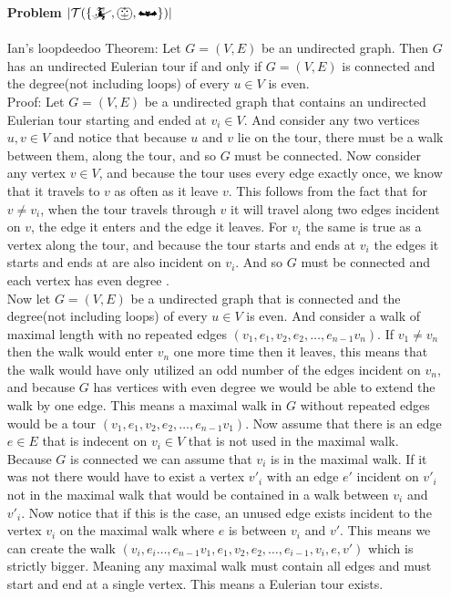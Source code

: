 \documentclass[12pt]{amsart}
\theoremstyle{definition}
\begin{document}
\begin{itemize}[align=left]
\item[\textbf{Problem $|\mathcal{T}(\{\mathwitch, \bigpumpkin, \mathbat\})|$}] %
    \;\\\\
    Ian's loopdeedoo Theorem: Let $G=(V,E)$ be an undirected graph. Then $G$ has an undirected Eulerian tour if and only if $G=(V,E)$ is connected and the degree(not including loops) of every $u\in V$ is even. \\

    Proof: Let $G=(V,E)$ be a undirected graph that contains an undirected Eulerian tour starting and ended at $v_i\in V$. And consider any two vertices $u,v\in V$ and notice that because $u$ and $v$ lie on the tour, there must be a walk between them, along the tour, and so $G$ must be connected. Now consider any vertex $v\in V$, and because the tour uses every edge exactly once, we know that it travels to $v$ as often as it leave $v$. This follows from the fact that for $v\neq v_i$, when the tour travels through $v$ it will travel along two edges incident on $v$, the edge it enters and the edge it leaves. For $v_i$ the same is true as a vertex along the tour, and because the tour starts and ends at $v_i$ the edges it starts and ends at are also incident on $v_i$. And so $G$ must be connected and each vertex has even degree .\\

    Now let $G=(V,E)$ be a undirected graph that is connected and the degree(not including loops) of every $u\in V$ is even. And consider a walk of maximal length with no repeated edges $(v_1,e_1,v_2,e_2,\dots,e_{n-1}v_n)$. If $v_1\neq v_n$ then the walk would enter $v_n$ one more time then it leaves, this means that the walk would have only utilized an odd number of the edges incident on $v_n$, and because $G$ has vertices with even degree we would be able to extend the walk by one edge. This means a maximal walk in $G$ without repeated edges would be a tour $(v_1,e_1,v_2,e_2,\dots,e_{n-1}v_1)$. Now assume that there is an edge $e\in E$ that is indecent on $v_i\in V$ that is not used in the maximal walk. Because $G$ is connected we can assume that $v_i$ is in the maximal walk. If it was not there would have to exist a vertex $v'_i$ with an edge $e'$ incident on $v'_i$ not in the maximal walk that would be contained in a walk between $v_i$ and $v'_i$. Now notice that if this is the case, an unused edge exists incident to the vertex $v_i$ on the maximal walk where $e$ is between $v_i$ and $v'$. This means we can create the walk $(v_i, e_i\dots,e_{n-1}v_1,e_1,v_2,e_2,\dots, e_{i-1}, v_i,e,v')$ which is strictly bigger. Meaning any maximal walk must contain all edges and must start and end at a single vertex. This means a Eulerian tour exists.\\


\end{itemize}
\end{document}
